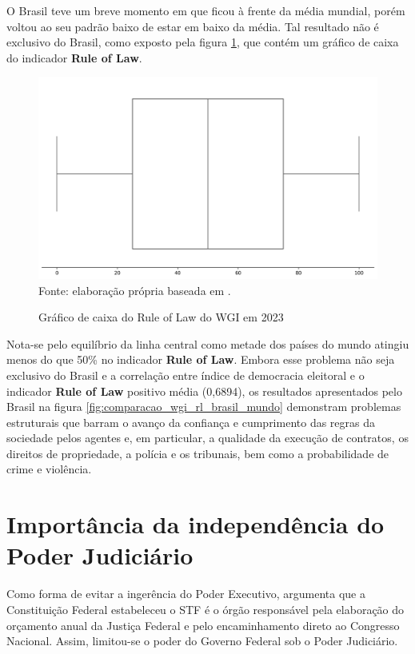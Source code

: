 O Brasil teve um breve momento em que ficou à frente da média mundial, porém voltou ao seu padrão baixo de estar em baixo da média. Tal resultado não é exclusivo do Brasil, como exposto pela figura \ref{fig:quartis_wgi_rl}, que contém um gráfico de caixa do indicador \textbf{Rule of Law}.

\begin{figure}[H]
	\centering
	\caption{Gráfico de caixa do Rule of Law do WGI em 2023}
	\includegraphics[width=1\linewidth]{figuras/quartis_wgi_rl}
	\label{fig:quartis_wgi_rl}
	\footnotesize{Fonte: elaboração própria baseada em \cite{wgi_dados}.}
\end{figure}

Nota-se pelo equilíbrio da linha central como metade dos países do mundo atingiu menos do que 50\% no indicador \textbf{Rule of Law}. Embora esse problema não seja exclusivo do Brasil e a correlação entre índice de democracia eleitoral e o indicador \textbf{Rule of Law} positivo média (0,6894), os resultados apresentados pelo Brasil na figura \ref{fig:comparacao_wgi_rl_brasil_mundo} demonstram problemas estruturais que barram o avanço da confiança e cumprimento das regras da sociedade pelos agentes e, em particular, a qualidade da execução de contratos, os direitos de propriedade, a polícia e os tribunais, bem como a probabilidade de crime e violência.

\section{Importância da independência do Poder Judiciário}

Como forma de evitar a ingerência do Poder Executivo, \cite{pires2021paradoxo} argumenta que a Constituição Federal estabeleceu o STF é o órgão responsável pela elaboração do orçamento anual da Justiça Federal e pelo encaminhamento direto ao Congresso Nacional. Assim, limitou-se o poder do Governo Federal sob o Poder Judiciário. 

